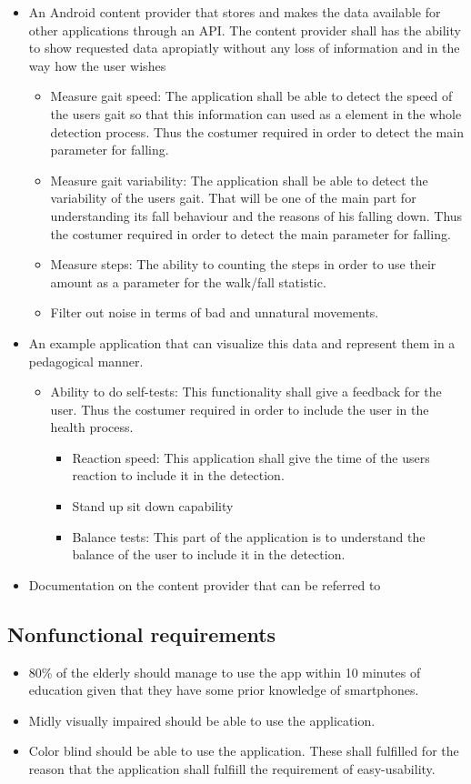 \begin{itemize}
\item An Android content provider that stores and makes the data available for other applications through an API. The content provider shall has the ability to show requested data apropiatly without any loss of information and in the way how the user wishes
\begin{itemize}
\item Measure gait speed: The application shall be able to detect the speed of the users gait so that this information can used as a element in the whole detection process. Thus the costumer required in order to detect the main parameter for falling.
\item Measure gait variability: The application shall be able to detect the variability of the users gait. That will be one of the main part for understanding its fall behaviour and the reasons of his falling down. Thus the costumer required in order to detect the main parameter for falling.
\item Measure steps: The ability to counting the steps in order to use their amount as a parameter for the walk/fall statistic.
\item Filter out noise in terms of bad and unnatural movements.
\end{itemize}
\item An example application that can visualize this data and represent them in a pedagogical manner.
\begin{itemize}
\item Ability to do self-tests: This functionality shall give a feedback for the user. Thus the costumer required in order to include the user in the health process.
\begin{itemize}
\item Reaction speed: This application shall give the time of the users reaction to include it in the detection.
\item Stand up sit down capability
\item Balance tests: This part of the application is to understand the balance of the user to include it in the detection.
\end{itemize}
\end{itemize}
\item Documentation on the content provider that can be referred to
\end{itemize}	

\subsection{Nonfunctional requirements}
\begin{itemize}
\item 80\% of the elderly should manage to use the app within 10 minutes of education given that they have some prior knowledge of smartphones.
\item Midly visually impaired should be able to use the application.
\item Color blind should be able to use the application. These shall fulfilled for the reason that the application shall fulfiill the requirement of easy-usability.
\end{itemize}	


